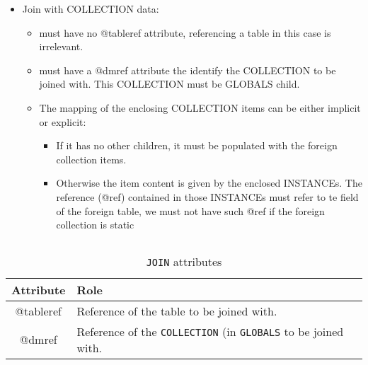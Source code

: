 \begin{itemize}
       
  \item Join with COLLECTION data:
       \begin{itemize}
         \item must have no @tableref attribute, referencing a table in this case is irrelevant.
         \item must have a @dmref attribute the identify the COLLECTION to be joined with. This COLLECTION must be GLOBALS child.
         \item The mapping of the enclosing COLLECTION items can be either implicit or explicit:
         \begin{itemize}
             \item If it has no other children, it must be populated with the foreign collection items.
             \item Otherwise the item content is given by the enclosed INSTANCEs. The reference (@ref) contained 
                      in those INSTANCEs must refer to te field of the foreign table, we must not have such @ref if the foreign 
                      collection is static
       \end{itemize}
  \end{itemize}
           
\end{itemize}

\begin{lstlisting}[frame=single,caption={\texttt{JOIN} },style=XML,basicstyle=\tiny]

\end{lstlisting}


\begin{table}[!htbp]
\small
\centering
\begin{tabulary}{\linewidth}{|c|J|}       
       \hline 
            \textbf{Attribute} & 
            \textbf {Role}\\
       \hline         \hline  
             @tableref& 
            Reference of the table to be joined with. \\
        \hline 
            @dmref & 
            Reference of the \texttt{COLLECTION} (in \texttt{GLOBALS} to be joined with. \\
        \hline 
     \end{tabulary}
     \caption{\texttt{JOIN} attributes} 
     \label{tbl:join-att}
 \end{table}


